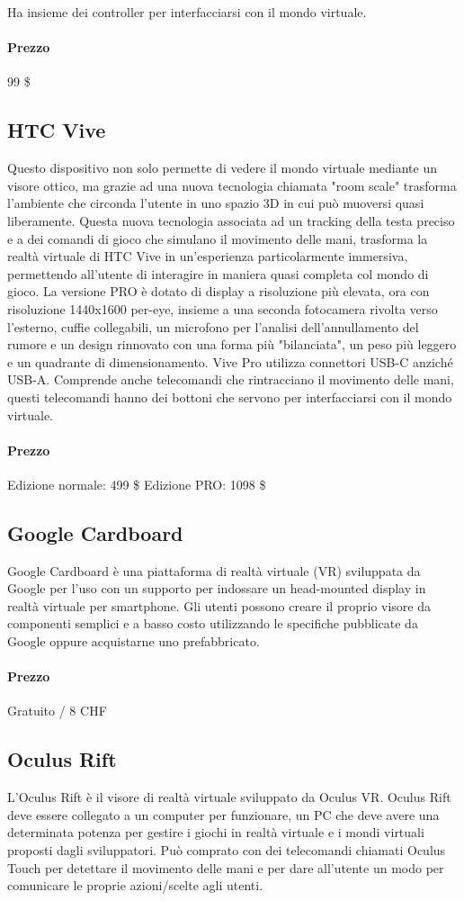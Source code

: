 \documentclass[8pt]{extarticle}
\begin{document}
\begin{multicols}{3}
Ha insieme dei controller per interfacciarsi con il mondo virtuale.

\paragraph{Prezzo} 99 \$
\subsection{HTC Vive}
Questo dispositivo non solo permette di vedere il mondo virtuale mediante un visore ottico, ma grazie ad una nuova tecnologia chiamata "room scale" trasforma l'ambiente che circonda l'utente in uno spazio 3D in cui può muoversi quasi liberamente. Questa nuova tecnologia associata ad un tracking della testa preciso e a dei comandi di gioco che simulano il movimento delle mani, trasforma la realtà virtuale di HTC Vive in un'esperienza particolarmente immersiva, permettendo all'utente di interagire in maniera quasi completa col mondo di gioco.
La versione PRO è dotato di display a risoluzione più elevata, ora con risoluzione 1440x1600 per-eye, insieme a una seconda fotocamera rivolta verso l'esterno, cuffie collegabili, un microfono per l'analisi dell'annullamento del rumore e un design rinnovato con una forma più "bilanciata", un peso più leggero e un quadrante di dimensionamento. Vive Pro utilizza connettori USB-C anziché USB-A. Comprende anche telecomandi che rintracciano il movimento delle mani, questi telecomandi hanno dei bottoni che servono per interfacciarsi con il mondo virtuale.
\paragraph{Prezzo}
Edizione normale: 499 \$ \quad Edizione PRO: 1098 \$
\subsection{Google Cardboard}
Google Cardboard è una piattaforma di realtà virtuale (VR) sviluppata da Google per l'uso con un supporto per indossare un head-mounted display in realtà virtuale per smartphone.  Gli utenti possono creare il proprio visore da componenti semplici e a basso costo utilizzando le specifiche pubblicate da Google oppure acquistarne uno prefabbricato. 
\paragraph{Prezzo} Gratuito / 8 CHF
\subsection{Oculus Rift}
L'Oculus Rift è il visore di realtà virtuale sviluppato da Oculus VR. 
Oculus Rift deve essere collegato a un computer per funzionare, un PC che deve avere una determinata potenza per gestire i giochi in realtà virtuale e i mondi virtuali proposti dagli sviluppatori. 
Può comprato con dei telecomandi chiamati Oculus Touch per detettare il movimento delle mani e per dare all’utente un modo per comunicare le proprie azioni/scelte agli utenti.
\\

\end{multicols}
\end{document}
